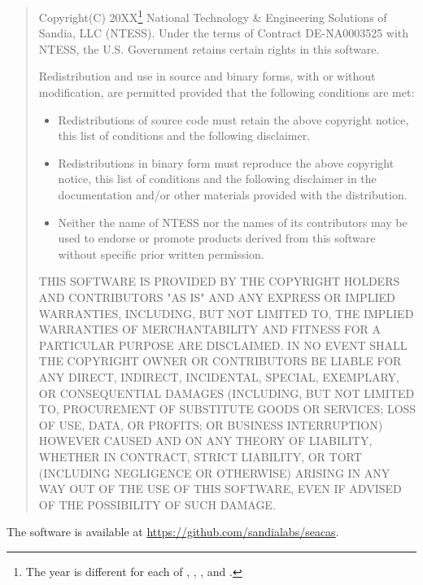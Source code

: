 \begin{quote}
Copyright(C) 20XX\footnote{The year is different for each of \epu{},
\exodiff, \ejoin, and \conjoin.} National Technology & Engineering Solutions
of Sandia, LLC (NTESS).  Under the terms of Contract DE-NA0003525 with
NTESS, the U.S. Government retains certain rights in this software.

Redistribution and use in source and binary forms, with or without
modification, are permitted provided that the following conditions are
met:

\begin{itemize}
\item Redistributions of source code must retain the above copyright
      notice, this list of conditions and the following disclaimer.

\item Redistributions in binary form must reproduce the above
      copyright notice, this list of conditions and the following
      disclaimer in the documentation and/or other materials provided
      with the distribution.

\item Neither the name of NTESS nor the names of its
      contributors may be used to endorse or promote products derived
      from this software without specific prior written permission.
\end{itemize}

THIS SOFTWARE IS PROVIDED BY THE COPYRIGHT HOLDERS AND CONTRIBUTORS
"AS IS" AND ANY EXPRESS OR IMPLIED WARRANTIES, INCLUDING, BUT NOT
LIMITED TO, THE IMPLIED WARRANTIES OF MERCHANTABILITY AND FITNESS FOR
A PARTICULAR PURPOSE ARE DISCLAIMED. IN NO EVENT SHALL THE COPYRIGHT
OWNER OR CONTRIBUTORS BE LIABLE FOR ANY DIRECT, INDIRECT, INCIDENTAL,
SPECIAL, EXEMPLARY, OR CONSEQUENTIAL DAMAGES (INCLUDING, BUT NOT
LIMITED TO, PROCUREMENT OF SUBSTITUTE GOODS OR SERVICES; LOSS OF USE,
DATA, OR PROFITS; OR BUSINESS INTERRUPTION) HOWEVER CAUSED AND ON ANY
THEORY OF LIABILITY, WHETHER IN CONTRACT, STRICT LIABILITY, OR TORT
(INCLUDING NEGLIGENCE OR OTHERWISE) ARISING IN ANY WAY OUT OF THE USE
OF THIS SOFTWARE, EVEN IF ADVISED OF THE POSSIBILITY OF SUCH DAMAGE.
\end{quote}

The software is available at \url{https://github.com/sandialabs/seacas}.

